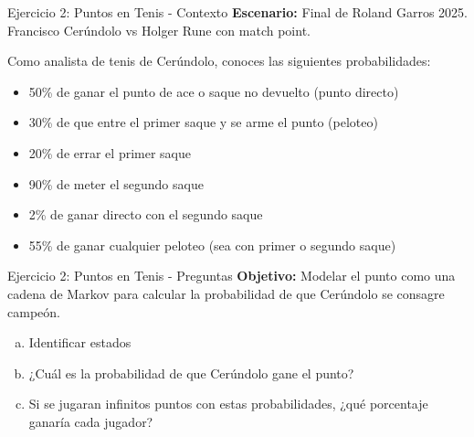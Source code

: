 \documentclass{beamer}
\begin{document}
\begin{frame}{Ejercicio 2: Puntos en Tenis - Contexto}
    \small
    \textbf{Escenario:} Final de Roland Garros 2025. Francisco Cerúndolo vs Holger Rune con match point.

    \vspace{0.5em}

    Como analista de tenis de Cerúndolo, conoces las siguientes probabilidades:

    \begin{itemize}
        \item 50\% de ganar el punto de ace o saque no devuelto (punto directo)
        \item 30\% de que entre el primer saque y se arme el punto (peloteo)
        \item 20\% de errar el primer saque
        \item 90\% de meter el segundo saque
        \item 2\% de ganar directo con el segundo saque
        \item 55\% de ganar cualquier peloteo (sea con primer o segundo saque)
    \end{itemize}
\end{frame}

\begin{frame}{Ejercicio 2: Puntos en Tenis - Preguntas}
    \small
    \textbf{Objetivo:} Modelar el punto como una cadena de Markov para calcular la probabilidad de que Cerúndolo se consagre campeón.

    \vspace{1em}

    \begin{enumerate}[a)]
        \item Identificar estados
        \item ¿Cuál es la probabilidad de que Cerúndolo gane el punto?
        \item Si se jugaran infinitos puntos con estas probabilidades, ¿qué porcentaje ganaría cada jugador?
    \end{enumerate}
\end{frame}
\end{document}
